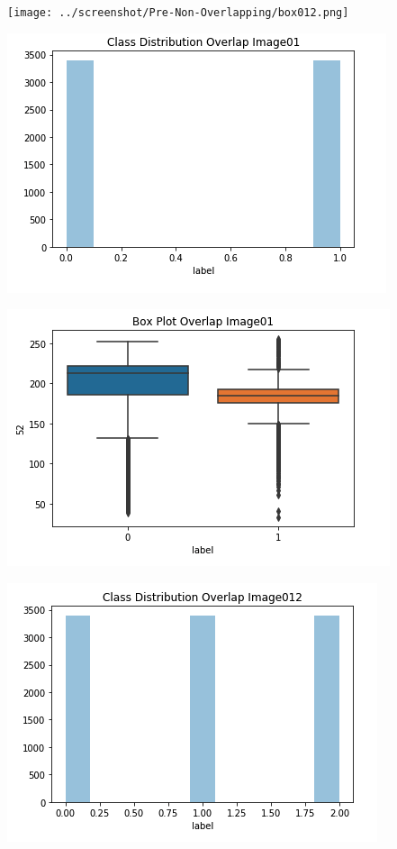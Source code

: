 \documentclass[12pt]{article}
\begin{document}
\begin{multicols*}{2}
\begin{center}
	\texttt{[image: ../screenshot/Pre-Non-Overlapping/box012.png]}

	\includegraphics[scale=0.4]{../screenshot/Pre-Overlapping/dist01.png}

	\includegraphics[scale=0.4]{../screenshot/Pre-Overlapping/box01.png}

	\includegraphics[scale=0.4]{../screenshot/Pre-Overlapping/dist012.png}


\end{center}
\end{multicols*}
\end{document}
